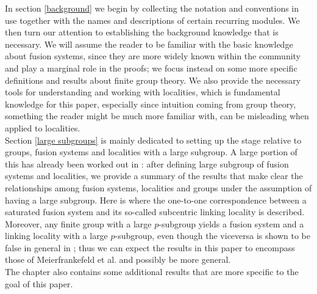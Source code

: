 \documentclass{amsart}
\numberwithin{equation}{section}
\theoremstyle{definition}
\theoremstyle{subresult}
\theoremstyle{caseresult}
\newcommand{\<}{\langle}
\renewcommand{\>}{\rangle}
\begin{document}
In section \ref{background} we begin by collecting the notation and conventions in use together with the names and descriptions of certain recurring modules. We then turn our attention to establishing the background knowledge that is necessary. We will assume the reader to be familiar with the basic knowledge about fusion systems, since they are more widely known within the community and play a marginal role in the proofs; we focus instead on some more specific definitions and results about finite group theory. We also provide the necessary tools for understanding and working with localities, which is fundamental knowledge for this paper, especially since intuition coming from group theory, something the reader might be much more familiar with, can be misleading when applied to localities.\\

Section \ref{large subgroups} is mainly dedicated to setting up the stage relative to groups, fusion systems and localities with a large subgroup. A large portion of this has already been worked out in \cite{Henke-Salati:2026}: after defining large subgroup of fusion systems and localities, we provide a summary of the results that make clear the relationships among fusion systems, localities and groups under the assumption of having a large subgroup. Here is where the one-to-one correspondence between a saturated fusion system and its so-called subcentric linking locality is described. Moreover, any finite group with a large $p$-subgroup yields a fusion system and a linking locality with a large $p$-subgroup, even though the viceversa is shown to be false in general in \cite{Henke-Salati:2026}; thus we can expect the results in this paper to encompass those of Meierfrankefeld et al. and possibly be more general.\\
The chapter also contains some additional results that are more specific to the goal of this paper.\\
\end{document}
